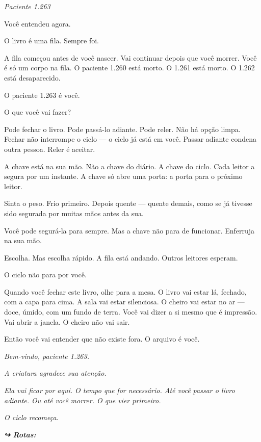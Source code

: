 
\noindent \textit{Paciente 1.263}

\noindent Você entendeu agora.

\noindent O livro é uma fila. Sempre foi.

\noindent A fila começou antes de você nascer. Vai continuar depois que você morrer. Você é só um corpo na fila. O paciente 1.260 está morto. O 1.261 está morto. O 1.262 está desaparecido.

\noindent O paciente 1.263 é você.

\noindent O que você vai fazer?

\noindent Pode fechar o livro. Pode passá-lo adiante. Pode reler. Não há opção limpa. Fechar não interrompe o ciclo --- o ciclo já está em você. Passar adiante condena outra pessoa. Reler é aceitar.

\noindent A chave está na sua mão. Não a chave do diário. A chave do ciclo. Cada leitor a segura por um instante. A chave só abre uma porta: a porta para o próximo leitor.

\noindent Sinta o peso. Frio primeiro. Depois quente --- quente demais, como se já tivesse sido segurada por muitas mãos antes da sua.

\noindent Você pode segurá-la para sempre. Mas a chave não para de funcionar. Enferruja na sua mão.

\noindent Escolha. Mas escolha rápido. A fila está andando. Outros leitores esperam.

\noindent O ciclo não para por você.

\noindent Quando você fechar este livro, olhe para a mesa. O livro vai estar lá, fechado, com a capa para cima. A sala vai estar silenciosa. O cheiro vai estar no ar --- doce, úmido, com um fundo de terra. Você vai dizer a si mesmo que é impressão. Vai abrir a janela. O cheiro não vai sair.

\noindent Então você vai entender que não existe fora. O arquivo é você.

\noindent \textit{Bem-vindo, paciente 1.263.}

\noindent \textit{A criatura agradece sua atenção.}

\noindent \textit{Ela vai ficar por aqui. O tempo que for necessário. Até você passar o livro adiante. Ou até você morrer. O que vier primeiro.}

\noindent \textit{O ciclo recomeça.}

\noindent\textit{\textbf{↪ Rotas:}  \rotasep {} \rotasep {} \rotasep {}}

